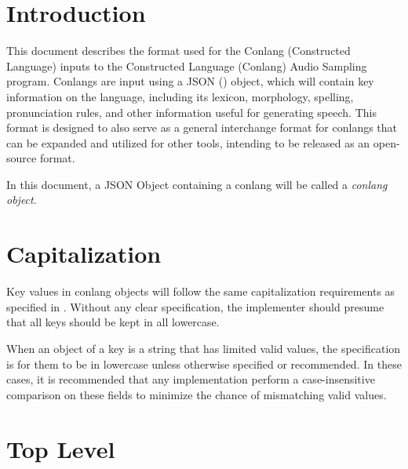 \chapter{Introduction}

This document describes the format used for the Conlang (Constructed Language) inputs to the Constructed Language (Conlang) Audio Sampling program.  Conlangs are input using a JSON (\cite{JSONDataInterchange2017}) object, which will contain key information on the language, including its lexicon, morphology, spelling, pronunciation rules, and other information useful for generating speech.  This format is designed to also serve as a general interchange format for conlangs that can be expanded and utilized for other tools, intending to be released as an open-source format.

In this document, a JSON Object containing a conlang will be called a \emph{conlang object}.

\chapter{Capitalization}
Key values in conlang objects will follow the same capitalization requirements as specified in \cite{JSONDataInterchange2017}.  Without any clear specification, the implementer should presume that all keys should be kept in all lowercase.

When an object of a key is a string that has limited valid values, the specification is for them to be in lowercase unless otherwise specified or recommended.  In these cases, it is recommended that any implementation perform a case-insensitive comparison on these fields to minimize the chance of mismatching valid values.

\chapter{Top Level}

